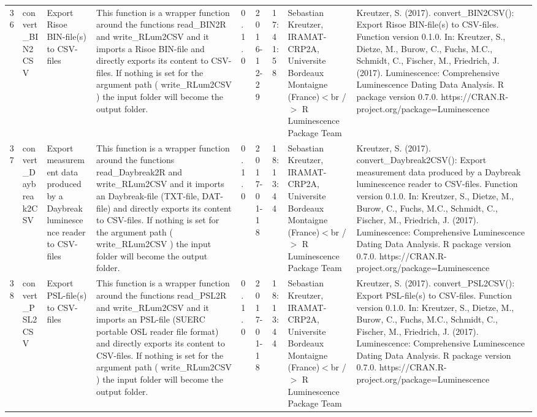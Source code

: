 \begin{table}[ht]
\begin{tabular}{rllllllll}
 \\ 
  36 & convert\_BIN2CSV & Export Risoe BIN-file(s) to CSV-files & This function is a wrapper function around the functions  read\_BIN2R  and write\_RLum2CSV  and it imports a Risoe BIN-file and directly exports its content to CSV-files. If nothing is set for the argument  path  ( write\_RLum2CSV ) the input folder will become the output folder. & 0.1.0 & 2016-12-29 & 17:41:58
 & Sebastian Kreutzer, IRAMAT-CRP2A, Universite Bordeaux Montaigne (France)$<$br /$>$  R Luminescence Package Team & Kreutzer, S. (2017). convert\_BIN2CSV(): Export Risoe BIN-file(s) to CSV-files. Function version 0.1.0. In: Kreutzer, S., Dietze, M., Burow, C., Fuchs, M.C., Schmidt, C., Fischer, M., Friedrich, J. (2017). Luminescence: Comprehensive Luminescence Dating Data Analysis. R package version 0.7.0. https://CRAN.R-project.org/package=Luminescence
 \\ 
  37 & convert\_Daybreak2CSV & Export measurement data produced by a Daybreak luminescence reader to CSV-files & This function is a wrapper function around the functions  read\_Daybreak2R  and write\_RLum2CSV  and it imports an Daybreak-file (TXT-file, DAT-file) and directly exports its content to CSV-files.  If nothing is set for the argument  path  ( write\_RLum2CSV ) the input folder will become the output folder. & 0.1.0 & 2017-01-18 & 18:13:44
 & Sebastian Kreutzer, IRAMAT-CRP2A, Universite Bordeaux Montaigne (France)$<$br /$>$  R Luminescence Package Team & Kreutzer, S. (2017). convert\_Daybreak2CSV(): Export measurement data produced by a Daybreak luminescence reader to CSV-files. Function version 0.1.0. In: Kreutzer, S., Dietze, M., Burow, C., Fuchs, M.C., Schmidt, C., Fischer, M., Friedrich, J. (2017). Luminescence: Comprehensive Luminescence Dating Data Analysis. R package version 0.7.0. https://CRAN.R-project.org/package=Luminescence
 \\ 
  38 & convert\_PSL2CSV & Export PSL-file(s) to CSV-files & This function is a wrapper function around the functions  read\_PSL2R  and write\_RLum2CSV  and it imports an PSL-file (SUERC portable OSL reader file format) and directly exports its content to CSV-files. If nothing is set for the argument  path  ( write\_RLum2CSV ) the input folder will become the output folder. & 0.1.0 & 2017-01-18 & 18:13:44
 & Sebastian Kreutzer, IRAMAT-CRP2A, Universite Bordeaux Montaigne (France)$<$br /$>$  R Luminescence Package Team & Kreutzer, S. (2017). convert\_PSL2CSV(): Export PSL-file(s) to CSV-files. Function version 0.1.0. In: Kreutzer, S., Dietze, M., Burow, C., Fuchs, M.C., Schmidt, C., Fischer, M., Friedrich, J. (2017). Luminescence: Comprehensive Luminescence Dating Data Analysis. R package version 0.7.0. https://CRAN.R-project.org/package=Luminescence

\end{tabular}
\end{table}
